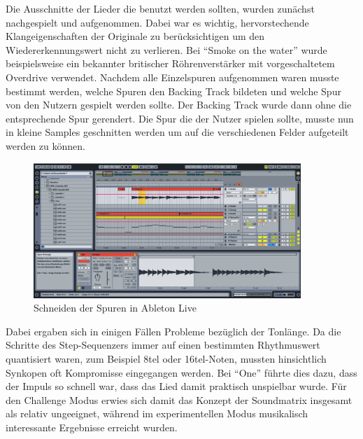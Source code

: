 Die Ausschnitte der Lieder die benutzt werden sollten, wurden zunächst nachgespielt und aufgenommen. Dabei war es wichtig, hervorstechende Klangeigenschaften der Originale zu berücksichtigen um den Wiedererkennungswert nicht zu verlieren. Bei \enquote{Smoke on the water} wurde beispielsweise ein bekannter britischer Röhrenverstärker mit vorgeschaltetem Overdrive verwendet. Nachdem alle Einzelspuren aufgenommen waren musste bestimmt werden, welche Spuren den Backing Track bildeten und welche Spur von den Nutzern gespielt werden sollte. Der Backing Track wurde dann ohne die entsprechende Spur gerendert. Die Spur die der Nutzer spielen sollte, musste nun in kleine Samples geschnitten werden um auf die verschiedenen Felder aufgeteilt werden zu können.

\begin{figure}[htbp] 
  \centering
     \includegraphics[width=0.9\textwidth]{images/Musikkonzeption}
  \caption{Schneiden der Spuren in Ableton Live}
  \label{fig:audio1}
\end{figure}

Dabei ergaben sich in einigen Fällen Probleme bezüglich der Tonlänge. Da die Schritte des Step-Sequenzers immer auf einen bestimmten Rhythmuswert quantisiert waren, zum Beispiel 8tel oder 16tel-Noten, mussten hinsichtlich Synkopen oft Kompromisse eingegangen werden. Bei \enquote{One} führte dies dazu, dass der Impuls so schnell war, dass das Lied damit praktisch unspielbar wurde. Für den Challenge Modus erwies sich damit das Konzept der Soundmatrix insgesamt als relativ ungeeignet, während im experimentellen Modus musikalisch interessante Ergebnisse erreicht wurden.